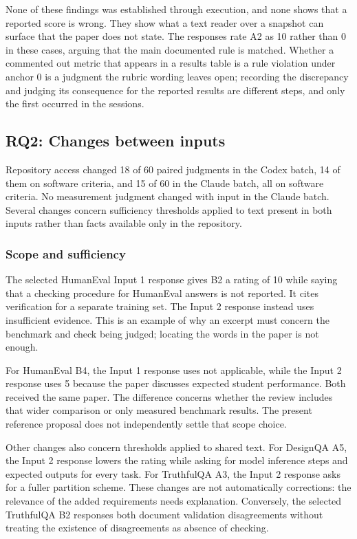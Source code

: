 \documentclass[10pt,conference]{IEEEtran}
\begin{document}
None of these findings was established through execution, and none shows that a reported score is wrong. They show what a text reader over a snapshot can surface that the paper does not state. The responses rate A2 as 10 rather than 0 in these cases, arguing that the main documented rule is matched. Whether a commented out metric that appears in a results table is a rule violation under anchor 0 is a judgment the rubric wording leaves open; recording the discrepancy and judging its consequence for the reported results are different steps, and only the first occurred in the sessions.

\subsection{RQ2: Changes between inputs}
Repository access changed 18 of 60 paired judgments in the Codex batch, 14 of them on software criteria, and 15 of 60 in the Claude batch, all on software criteria. No measurement judgment changed with input in the Claude batch. Several changes concern sufficiency thresholds applied to text present in both inputs rather than facts available only in the repository.
\subsubsection{Scope and sufficiency}
The selected HumanEval Input 1 response gives B2 a rating of 10 while saying that a checking procedure for HumanEval answers is not reported. It cites verification for a separate training set. The Input 2 response instead uses insufficient evidence. This is an example of why an excerpt must concern the benchmark and check being judged; locating the words in the paper is not enough.

For HumanEval B4, the Input 1 response uses not applicable, while the Input 2 response uses 5 because the paper discusses expected student performance. Both received the same paper. The difference concerns whether the review includes that wider comparison or only measured benchmark results. The present reference proposal does not independently settle that scope choice.

Other changes also concern thresholds applied to shared text. For DesignQA A5, the Input 2 response lowers the rating while asking for model inference steps and expected outputs for every task. For TruthfulQA A3, the Input 2 response asks for a fuller partition scheme. These changes are not automatically corrections: the relevance of the added requirements needs explanation. Conversely, the selected TruthfulQA B2 responses both document validation disagreements without treating the existence of disagreements as absence of checking.
\end{document}
